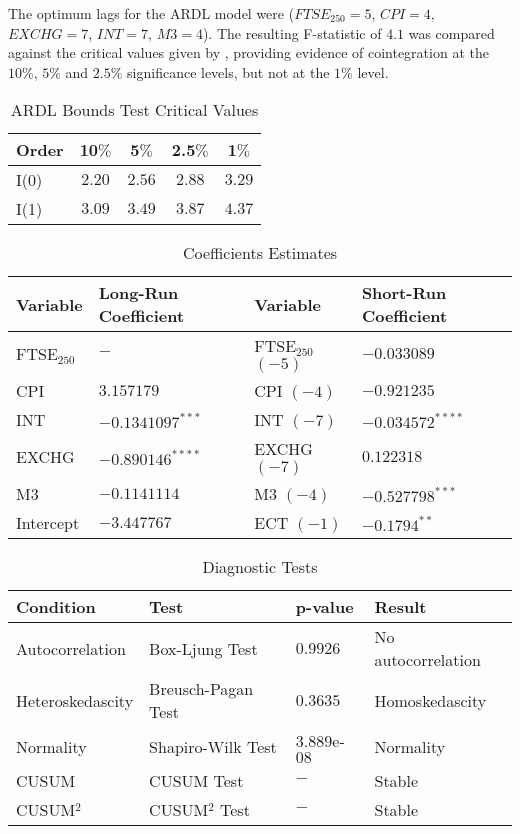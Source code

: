 \documentclass[11pt,a4paper]{article}
\newcommand{\citeboth}[1]{\citeauthor{#1} \citep{#1}}
\begin{document}
The optimum lags for the ARDL model were ($FTSE_{250} = 5$, $CPI = 4$, $EXCHG=7$, $INT =7$, $M3=4$). The resulting F-statistic of $4.1$ was compared against the critical values
given by \citeboth{pesaran2001}, providing evidence of cointegration 
at the $10\%$, $5\%$ and $2.5\%$ significance levels, but not at the $1\%$ 
level.

\begin{table}[h!]
    \centering
    \caption{ARDL Bounds Test Critical Values}
    \begin{tabular}{lcccc}
        \toprule
        \textbf{Order} & \textbf{10$\%$} & \textbf{5$\%$} & \textbf{2.5$\%$} & \textbf{1$\%$} \\
        \midrule
        I(0) & $2.20$ & $2.56$ & $2.88$ & $3.29$ \\
        I(1) & $3.09$ & $3.49$ & $3.87$  & $4.37$ \\
        \bottomrule
    \end{tabular}
\end{table}

\begin{table}[h!]
    \centering
    \caption{Coefficients Estimates}
    \begin{tabular}{llll}
        \toprule
        \textbf{Variable} & \textbf{Long-Run Coefficient} & \textbf{Variable} & \textbf{Short-Run Coefficient} \\
        \midrule
        FTSE$_{250}$ & $-$ & FTSE$_{250}$ $(-5)$  & $-0.033089$ \\
        CPI & $3.157179$ & CPI $(-4)$ & $-0.921235$ \\
        INT & $-0.1341097^{***}$ & INT $(-7)$ & $-0.034572^{****}$\\
        EXCHG &  $-0.890146^{****}$ & EXCHG $(-7)$ & $0.122318$ \\
        M3 & $-0.1141114$ & M3 $(-4)$ & $-0.527798^{***}$ \\
        Intercept & $-3.447767$ & ECT $(-1)$ & $-0.1794^{**}$ \\
        \bottomrule
    \end{tabular}
\end{table}

\begin{table}[h!]
    \centering
    \caption{Diagnostic Tests}
    \begin{tabular}{llll}
        \toprule
        \textbf{Condition} & \textbf{Test} & \textbf{p-value} & \textbf{Result} \\
        \midrule
        Autocorrelation & Box-Ljung Test & $0.9926$ & No autocorrelation \\
        Heteroskedascity & Breusch-Pagan Test & $0.3635$ & Homoskedascity \\
        Normality & Shapiro-Wilk Test & $3.889$e-$08$ & Normality \\
        CUSUM & CUSUM Test & $-$ & Stable \\
        CUSUM$^2$ & CUSUM$^2$ Test & $-$ & Stable \\
        \bottomrule
    \end{tabular}
\end{table}
\end{document}
